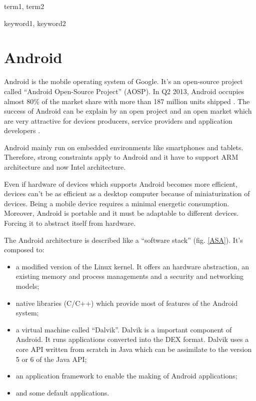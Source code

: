 \documentclass{sig-alternate}
\def \DALVIK{Dalvik\xspace}
\def \ANDROID{Android\xspace}
\def \DEX{DEX\xspace}
\begin{document}
\terms
term1, term2

\keywords
keyword1, keyword2

  \section{Android}

    \ANDROID is the mobile operating system of Google.
    It's an open-source project called ``\ANDROID Open-Source Project'' (AOSP).
    In Q2 2013, \ANDROID occupies almost 80\% of the market share with more than 187 million units shipped \cite{idc-website}.
    The success of \ANDROID can be explain by an open project and an open market
    which are very attractive for devices producers, service providers and application developers \cite{ieee-butler-android-landscape}.

    \ANDROID mainly run on embedded environments like smartphones and tablets.
    Therefore, strong constraints apply to \ANDROID
    and it have to support ARM architecture and now Intel architecture.
    
    Even if hardware of devices which supports \ANDROID becomes more efficient,
    devices can't be as efficient as a desktop computer because of miniaturization of devices.
    Being a mobile device requires a minimal energetic consumption.
    Moreover, \ANDROID is portable and it must be adaptable to different devices.
    Forcing it to abstract itself from hardware.

    The \ANDROID architecture is described like a ``software stack'' (fig. \ref{ASA}).
    It's composed to:
    \begin{itemize}
      \item a modified version of the Linux kernel.
        It offers an hardware abstraction,
        an existing memory and process managements
        and a security and networking models;
      \item native libraries (C/C++)
        which provide most of features of the \ANDROID system;
      \item a virtual machine called ``\DALVIK''. \DALVIK is a important component of \ANDROID.
        It runs applications converted into the \DEX format.
        \DALVIK uses a core API written from scratch in Java
        which can be assimilate to the version 5 or 6 of the Java API;
      \item an application framework to enable the making of \ANDROID applications;
      \item and some default applications.
    \end{itemize}
\end{document}
